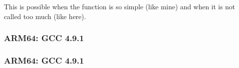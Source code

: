 This is possible when the function is so simple (like mine) and when it is not called too much (like here).

\subsubsection{ARM64: \Optimizing GCC 4.9.1}



\subsubsection{ARM64: \NonOptimizing GCC 4.9.1}


